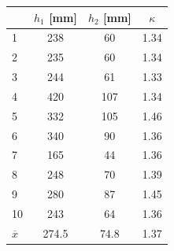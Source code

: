 \documentclass[czech,11pt,a4paper]{article}
\begin{document}
	
	\begin{center}
		\begin{tabular}{|l|c|c|c|}
		\hline
		 &$h_1$  [mm]& $h_2$ [mm]  & $\kappa$ \\ \hline
		1&238 & 60  & 1.34                  \\ \hline
		2&235 & 60  & 1.34                  \\ \hline
		3&244 & 61  & 1.33                  \\ \hline
		4&420 & 107 & 1.34                  \\ \hline
		5&332 & 105 & 1.46                  \\ \hline
		6&340 & 90  & 1.36                  \\ \hline
		7&165 & 44  & 1.36                  \\ \hline
		8&248 & 70  & 1.39                  \\ \hline
		9&280 & 87  & 1.45                  \\ \hline
		10&243 & 64  & 1.36                  \\ \hline  \hline
		$\overline{x}$&274.5 & 74.8  & 1.37                  \\ \hline
		

\end{tabular}
\end{center}
\end{document}
